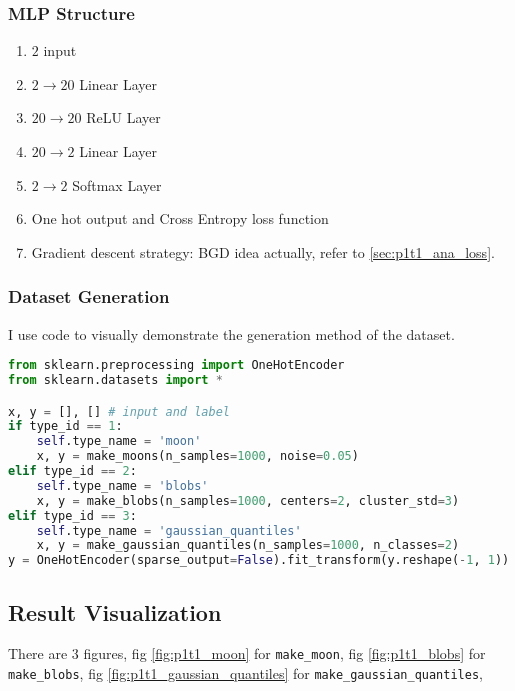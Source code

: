 \subsubsection{MLP Structure}

\begin{enumerate}
  \item $2$ input
  \item $2 \to 20$ Linear Layer
  \item $20 \to 20$ ReLU Layer
  \item $20 \to 2$ Linear Layer
  \item $2 \to 2$ Softmax Layer
  \item One hot output and Cross Entropy loss function
  \item Gradient descent strategy: BGD idea actually, refer to \ref{sec:p1t1_ana_loss}.
\end{enumerate}

\subsubsection{Dataset Generation}

I use code to visually demonstrate the generation method of the dataset.

\begin{lstlisting}[language=Python]
from sklearn.preprocessing import OneHotEncoder
from sklearn.datasets import *

x, y = [], [] # input and label
if type_id == 1:
    self.type_name = 'moon'
    x, y = make_moons(n_samples=1000, noise=0.05)
elif type_id == 2:
    self.type_name = 'blobs'
    x, y = make_blobs(n_samples=1000, centers=2, cluster_std=3)
elif type_id == 3:
    self.type_name = 'gaussian_quantiles'
    x, y = make_gaussian_quantiles(n_samples=1000, n_classes=2)
y = OneHotEncoder(sparse_output=False).fit_transform(y.reshape(-1, 1))
\end{lstlisting}

\subsection{Result Visualization}

There are 3 figures, fig \ref{fig:p1t1_moon} for \texttt{make\_moon}, fig \ref{fig:p1t1_blobs} for \texttt{make\_blobs}, fig \ref{fig:p1t1_gaussian_quantiles} for \texttt{make\_gaussian\_quantiles},

